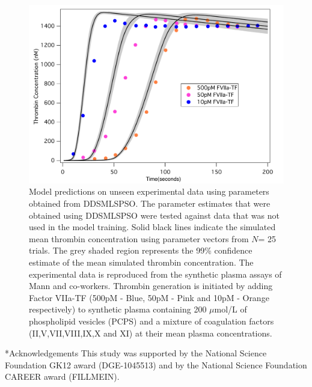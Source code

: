 \documentclass[12pt]{article}
\makeatletter
\renewcommand\section{\@startsection
	{subsection}{2}{0mm}
	{-0.2in}
	{0.05\baselineskip}
	{\normalfont\large\bfseries}}
\makeatother
\begin{document}
\begin{figure}[H]
\centering
\includegraphics[width=1.0\textwidth,height=0.5\textheight]{./figs/Figure_5_Sim_Validate_E2_E4_E6.pdf}
\caption{Model predictions on unseen experimental data using parameters obtained from DDSMLSPSO. The parameter estimates that were obtained using DDSMLSPSO were tested against data that was not used in the model training. Solid black lines indicate the simulated mean thrombin concentration using parameter vectors from $N$= 25 trials. The grey shaded region represents the 99\% confidence estimate of the mean simulated thrombin concentration. The experimental data is reproduced from the synthetic plasma assays of Mann and co-workers. Thrombin generation is initiated by adding Factor VIIa-TF (500pM - Blue, 50pM - Pink and 10pM - Orange respectively) to synthetic plasma containing 200 $\mu$mol/L of phospholipid vesicles (PCPS) and a mixture of coagulation factors (II,V,VII,VIII,IX,X and XI) at their mean plasma concentrations. 
}\label{fig-validation}
\end{figure}


\section*{Acknowledgements}
This study was supported by the National Science Foundation GK12 award (DGE-1045513) 
and by the National Science Foundation CAREER award (FILLMEIN).

\clearpage
%

\end{document}
